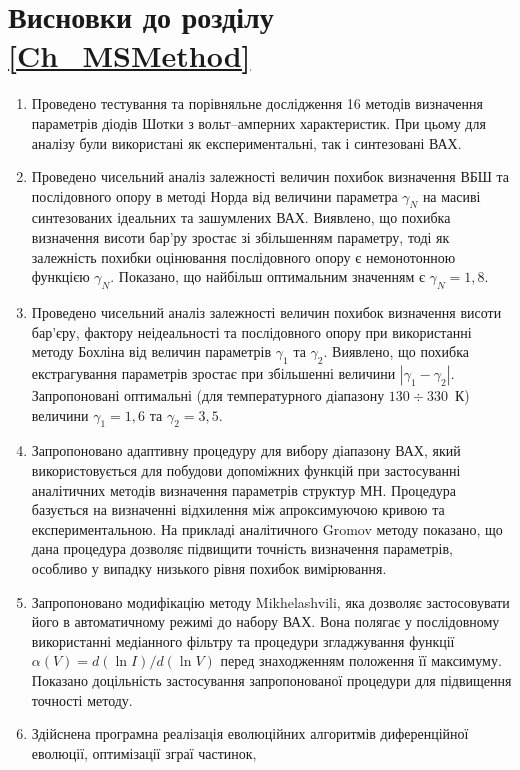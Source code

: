 \section*{Висновки до розділу \ref{Ch_MSMethod}}
  \begin{enumerate}
     \item Проведено тестування та порівняльне дослідження 16 методів визначення параметрів діодів Шотки з вольт--амперних характеристик.
           При цьому для аналізу були використані як експериментальні, так і синтезовані ВАХ.
     \item Проведено чисельний аналіз залежності величин похибок визначення ВБШ та послідовного опору в методі Норда від величини параметра $\gamma_N$ на масиві синтезованих ідеальних та зашумлених ВАХ.
     Виявлено, що похибка визначення висоти бар'ру зростає зі збільшенням параметру, тоді як залежність похибки оцінювання послідовного опору є немонотонною функцією $\gamma_N$.
     Показано, що найбільш оптимальним значенням є $\gamma_N=1,8$.
     \item Проведено чисельний аналіз залежності величин похибок визначення висоти бар'єру, фактору неідеальності та послідовного опору при використанні методу Бохліна від величин параметрів $\gamma_1$ та $\gamma_2$.
     Виявлено, що похибка екстрагування параметрів зростає при збільшенні величини $|\gamma_1-\gamma_2|$.
     Запропоновані оптимальні (для температурного діапазону $130\div330$~К) величини $\gamma_1=1,6$ та $\gamma_2=3,5$.
     \item Запропоновано адаптивну процедуру для вибору діапазону ВАХ, який використовується для побудови допоміжних функцій при застосуванні аналітичних методів визначення параметрів структур МН.
         Процедура базується на визначенні відхилення між апроксимуючою кривою та експериментальною.
         На прикладі аналітичного Gromov методу показано, що дана процедура дозволяє підвищити точність визначення параметрів, особливо у випадку низького рівня похибок вимірювання.
     \item Запропоновано модифікацію методу Mikhelashvili, яка дозволяє застосовувати його в автоматичному режимі до набору ВАХ.
     Вона полягає у послідовному використанні медіанного фільтру та процедури згладжування функції $\alpha(V)=d(\ln I)/d(\ln V)$ перед знаходженням положення її максимуму.
     Показано доцільність застосування запропонованої процедури для підвищення точності методу.
    \item Здійснена програмна реалізація еволюційних алгоритмів  диференційної еволюції, оптимізації зграї частинок,

\end{enumerate}

